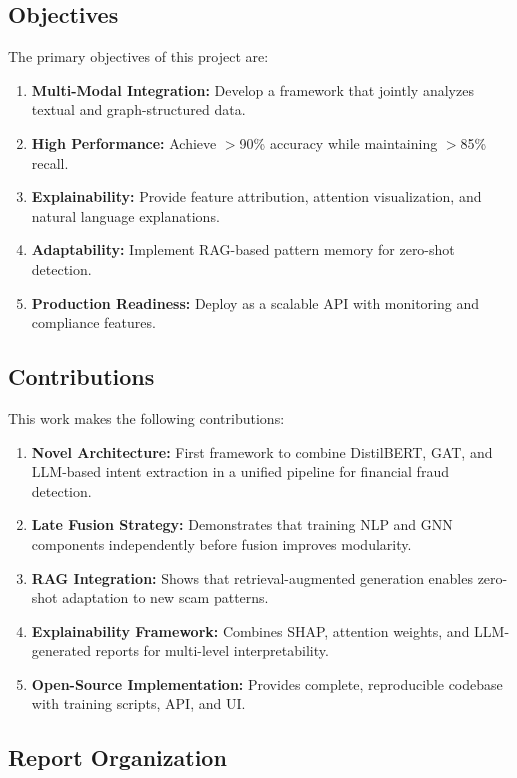 \documentclass[12pt,a4paper]{article}
\begin{document}
\subsection{Objectives}

The primary objectives of this project are:

\begin{enumerate}
    \item \textbf{Multi-Modal Integration:} Develop a framework that jointly analyzes textual and graph-structured data.
    \item \textbf{High Performance:} Achieve $>$90\% accuracy while maintaining $>$85\% recall.
    \item \textbf{Explainability:} Provide feature attribution, attention visualization, and natural language explanations.
    \item \textbf{Adaptability:} Implement RAG-based pattern memory for zero-shot detection.
    \item \textbf{Production Readiness:} Deploy as a scalable API with monitoring and compliance features.
\end{enumerate}

\subsection{Contributions}

This work makes the following contributions:

\begin{enumerate}
    \item \textbf{Novel Architecture:} First framework to combine DistilBERT, GAT, and LLM-based intent extraction in a unified pipeline for financial fraud detection.
    \item \textbf{Late Fusion Strategy:} Demonstrates that training NLP and GNN components independently before fusion improves modularity.
    \item \textbf{RAG Integration:} Shows that retrieval-augmented generation enables zero-shot adaptation to new scam patterns.
    \item \textbf{Explainability Framework:} Combines SHAP, attention weights, and LLM-generated reports for multi-level interpretability.
    \item \textbf{Open-Source Implementation:} Provides complete, reproducible codebase with training scripts, API, and UI.
\end{enumerate}

\subsection{Report Organization}
\end{document}

